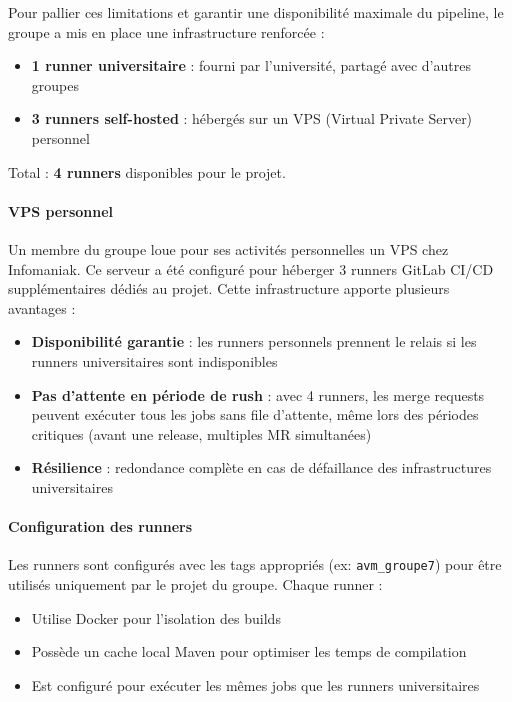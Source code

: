 Pour pallier ces limitations et garantir une disponibilité maximale du pipeline, le groupe a mis en place une infrastructure renforcée :

\begin{itemize}
    \item \textbf{1 runner universitaire} : fourni par l'université, partagé avec d'autres groupes
    \item \textbf{3 runners self-hosted} : hébergés sur un VPS (Virtual Private Server) personnel
\end{itemize}

Total : \textbf{4 runners} disponibles pour le projet.

\paragraph{VPS personnel}

Un membre du groupe loue pour ses activités personnelles un VPS chez Infomaniak. Ce serveur a été configuré pour héberger 3 runners GitLab CI/CD supplémentaires dédiés au projet. Cette infrastructure apporte plusieurs avantages :

\begin{itemize}
    \item \textbf{Disponibilité garantie} : les runners personnels prennent le relais si les runners universitaires sont indisponibles
    \item \textbf{Pas d'attente en période de rush} : avec 4 runners, les merge requests peuvent exécuter tous les jobs sans file d'attente, même lors des périodes critiques (avant une release, multiples MR simultanées)
    \item \textbf{Résilience} : redondance complète en cas de défaillance des infrastructures universitaires
\end{itemize}

\paragraph{Configuration des runners}

Les runners sont configurés avec les tags appropriés (ex: \texttt{avm\_groupe7}) pour être utilisés uniquement par le projet du groupe. Chaque runner :
\begin{itemize}
    \item Utilise Docker pour l'isolation des builds
    \item Possède un cache local Maven pour optimiser les temps de compilation
    \item Est configuré pour exécuter les mêmes jobs que les runners universitaires
\end{itemize}

